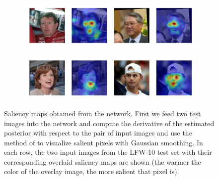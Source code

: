 \begin{figure}
    \begin{subfigure}
        \centering
        \includegraphics[width=0.65\linewidth, trim={0 1cm 0 0},clip]{saliency-new/saliency-smooth/eyesopen-1.jpeg}
        \footnotesize
        \vspace{0.4cm}
    \end{subfigure}
    
    \begin{subfigure}
        \centering
        \includegraphics[width=0.65\linewidth, trim={0 1cm 0 0},clip]{saliency-new/saliency-smooth/goodlooking-1.jpeg}
        \footnotesize
    \end{subfigure}
    
    \caption{Saliency maps obtained from the network. First we feed two test images into the network and compute the derivative of the estimated posterior with respect to the pair of input images and use the method of \cite{saliency} to visualize salient pixels with Gaussian smoothing. In each row, the two input images from the LFW-10 test set with their corresponding overlaid saliency maps are shown (the warmer the color of the overlay image, the more salient that pixel is).}
    \label{fig.5}
\end{figure}
